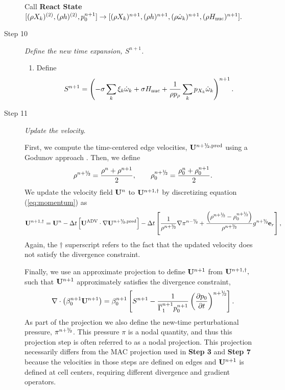 \begin{description}
Call {\bf React State}$[(\rho X_k)^{(2)},(\rho h)^{(2)}, p_0^{n+1}] \rightarrow [(\rho X_k)^{n+1}, (\rho h)^{n+1}, (\rho \dot\omega_k)^{n+1}, (\rho H_{\rm nuc})^{n+1}].$

\item[Step 10] {\em Define the new time expansion, $S^{n+1}$.}

\begin{enumerate}
\renewcommand{\theenumi}{{\bf \Alph{enumi}}}
\item Define
\begin{equation}
  S^{n+1} =  \left(-\sigma  \sum_k  \xi_k \omegadot_k  + \sigma \Hnuc +
  \frac{1}{\rho p_\rho} \sum_k p_{X_k}  \omegadot_k\right)^{n+1}.
\end{equation}

\end{enumerate}


\item[Step 11] {\em Update the velocity}.

First, we compute the time-centered edge velocities, $\Ub^{\nph,\pred}$
using a Godunov approach \citep{XRB_III}. Then, we define
\begin{equation}
\rho^\nph = \frac{\rho^n + \rho^{n+1}}{2}, \qquad \rho_0^\nph = \frac{\rho_0^n + \rho_0^{n+1}}{2}.
\end{equation}
We update the velocity field ${\bf{U}}^n$ to ${\bf{U}}^{n+1,\dagger}$ by discretizing
equation (\ref{eq:momentum}) as
\begin{equation}
\Ub^{n+1,\dagger}
= \Ub^n - \dt \left[\uadvtwo \cdot \nabla \Ub^{\nph,\pred} \right]
 - \dt \left[ \frac{1}{\rho^\nph} \nabla \pi^\nmh + \frac{\left(\rho^\nph-\rho_0^\nph\right)}{\rho^\nph} g^{\nph} \eb_r \right],
\end{equation}
Again, the $\dagger$ superscript refers
to the fact that the updated velocity does not satisfy the divergence
constraint.

Finally, we use an approximate projection to define ${\bf{U}}^{n+1}$
from ${\bf{U}}^{n+1,\dagger},$  such that ${\bf{U}}^{n+1}$ approximately
satisfies the divergence constraint,
\begin{equation}
\nabla \cdot \left(\beta_0^{n+1} \Ub^{n+1} \right) = \beta_0^{n+1} \left[ S^{n+1} - \frac{1}{\gammaonebar^{n+1}p_0^{n+1}}\left(\frac{\partial p_0}{\partial t}\right)^{\nph}\right].\label{eq:div3}
\end{equation}
As part of the projection we also define the new-time perturbational pressure, $\pi^\nph$.
This pressure $\pi$ is a nodal quantity, and thus this projection step is often referred to as a nodal projection.
This projection necessarily differs from the MAC projection used in
{\bf Step 3} and {\bf Step 7} because the velocities in those steps are defined
on edges and ${\bf{U}}^{n+1}$ is defined at cell centers, requiring different divergence
and gradient operators.


\end{description}

